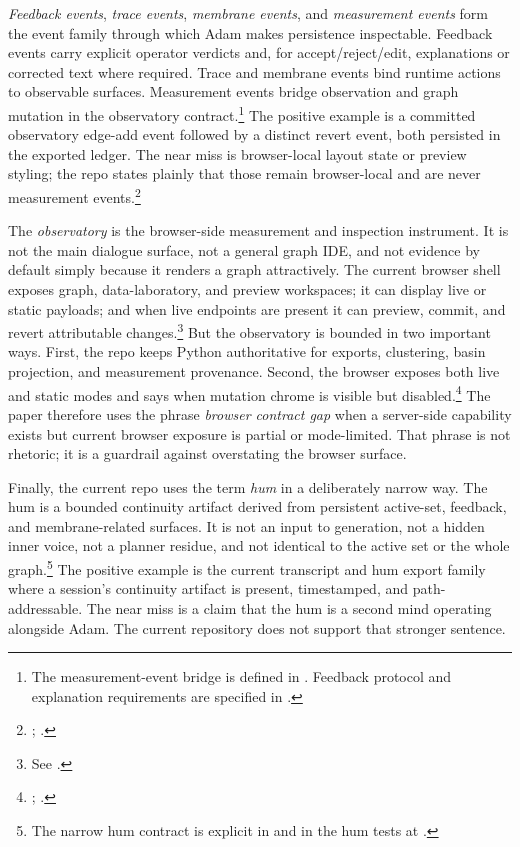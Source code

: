 \documentclass[10pt]{article}
\begin{document}
\emph{Feedback events}, \emph{trace events}, \emph{membrane events}, and \emph{measurement events} form the event family through which Adam makes persistence inspectable. Feedback events carry explicit operator verdicts and, for accept/reject/edit, explanations or corrected text where required. Trace and membrane events bind runtime actions to observable surfaces. Measurement events bridge observation and graph mutation in the observatory contract.\footnote{The measurement-event bridge is defined in . Feedback protocol and explanation requirements are specified in .} The positive example is a committed observatory edge-add event followed by a distinct revert event, both persisted in the exported ledger. The near miss is browser-local layout state or preview styling; the repo states plainly that those remain browser-local and are never measurement events.\footnote{; .}

The \emph{observatory} is the browser-side measurement and inspection instrument. It is not the main dialogue surface, not a general graph IDE, and not evidence by default simply because it renders a graph attractively. The current browser shell exposes graph, data-laboratory, and preview workspaces; it can display live or static payloads; and when live endpoints are present it can preview, commit, and revert attributable changes.\footnote{See .} But the observatory is bounded in two important ways. First, the repo keeps Python authoritative for exports, clustering, basin projection, and measurement provenance. Second, the browser exposes both live and static modes and says when mutation chrome is visible but disabled.\footnote{; .} The paper therefore uses the phrase \emph{browser contract gap} when a server-side capability exists but current browser exposure is partial or mode-limited. That phrase is not rhetoric; it is a guardrail against overstating the browser surface.

Finally, the current repo uses the term \emph{hum} in a deliberately narrow way. The hum is a bounded continuity artifact derived from persistent active-set, feedback, and membrane-related surfaces. It is not an input to generation, not a hidden inner voice, not a planner residue, and not identical to the active set or the whole graph.\footnote{The narrow hum contract is explicit in  and in the hum tests at .} The positive example is the current transcript and hum export family where a session's continuity artifact is present, timestamped, and path-addressable. The near miss is a claim that the hum is a second mind operating alongside Adam. The current repository does not support that stronger sentence.
\end{document}
